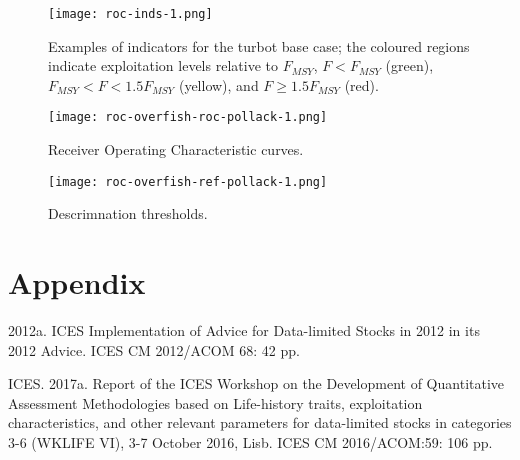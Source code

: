 \documentclass[12pt,doublespacing,a4paper]{ouparticle}
\begin{document}
\newpage
\begin{figure}[h]
\centering
\texttt{[image: roc-inds-1.png]}
\caption{Examples of indicators for the turbot base case; the coloured regions indicate exploitation levels relative to $F_{MSY}$, $F<F_{MSY}$ (green),  $F_{MSY} <F< 1.5F_{MSY}$ (yellow), and $F \geq 1.5F_{MSY}$ (red).}
\label{fig:indicators}
\end{figure}


\newpage
\begin{figure}[h]
\centering
\texttt{[image: roc-overfish-roc-pollack-1.png]}
\caption{Receiver Operating Characteristic curves.}
\label{fig:roc}
\end{figure}


\newpage
\begin{figure}[h]
\centering
\texttt{[image: roc-overfish-ref-pollack-1.png]}
\caption{Descrimnation thresholds.}
\label{fig:discrim}
\end{figure}

\clearpage
\section{Appendix}


2012a. ICES Implementation of Advice for Data-limited Stocks in 2012 in its 2012 Advice. ICES CM 2012/ACOM 68: 42 pp.

ICES. 2017a. Report of the ICES Workshop on the Development of Quantitative Assessment Methodologies based on Life-history traits, exploitation characteristics, and other relevant parameters for data-limited stocks in categories 3-6 (WKLIFE VI), 3-7 October 2016, Lisb. ICES CM 2016/ACOM:59: 106 pp.
\end{document}
